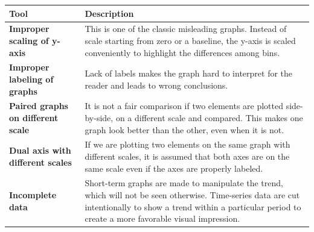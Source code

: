 \documentclass[]{book}
\theoremstyle{definition}
\theoremstyle{definition}
\theoremstyle{definition}
\theoremstyle{remark}
\begin{document}
\begin{longtable}[]{@{}ll@{}}
\toprule
\begin{minipage}[b]{0.16\columnwidth}\raggedright\strut
\textbf{Tool}\strut
\end{minipage} & \begin{minipage}[b]{0.78\columnwidth}\raggedright\strut
\textbf{Description}\strut
\end{minipage}\tabularnewline
\midrule
\endhead
\begin{minipage}[t]{0.16\columnwidth}\raggedright\strut
\textbf{Improper scaling of y-axis}\strut
\end{minipage} & \begin{minipage}[t]{0.78\columnwidth}\raggedright\strut
This is one of the classic misleading graphs. Instead of scale starting
from zero or a baseline, the y-axis is scaled conveniently to highlight
the differences among bins.\strut
\end{minipage}\tabularnewline
\begin{minipage}[t]{0.16\columnwidth}\raggedright\strut
\textbf{Improper labeling of graphs}\strut
\end{minipage} & \begin{minipage}[t]{0.78\columnwidth}\raggedright\strut
Lack of labels makes the graph hard to interpret for the reader and
leads to wrong conclusions.\strut
\end{minipage}\tabularnewline
\begin{minipage}[t]{0.16\columnwidth}\raggedright\strut
\textbf{Paired graphs on different scale}\strut
\end{minipage} & \begin{minipage}[t]{0.78\columnwidth}\raggedright\strut
It is not a fair comparison if two elements are plotted side-by-side, on
a different scale and compared. This makes one graph look better than
the other, even when it is not.\strut
\end{minipage}\tabularnewline
\begin{minipage}[t]{0.16\columnwidth}\raggedright\strut
\textbf{Dual axis with different scales}\strut
\end{minipage} & \begin{minipage}[t]{0.78\columnwidth}\raggedright\strut
If we are plotting two elements on the same graph with different scales,
it is assumed that both axes are on the same scale even if the axes are
properly labeled.\strut
\end{minipage}\tabularnewline
\begin{minipage}[t]{0.16\columnwidth}\raggedright\strut
\textbf{Incomplete data}\strut
\end{minipage} & \begin{minipage}[t]{0.78\columnwidth}\raggedright\strut
Short-term graphs are made to manipulate the trend, which will not be
seen otherwise. Time-series data are cut intentionally to show a trend
within a particular period to create a more favorable visual
impression.\strut
\end{minipage}\tabularnewline
\bottomrule
\end{longtable}
\end{document}
